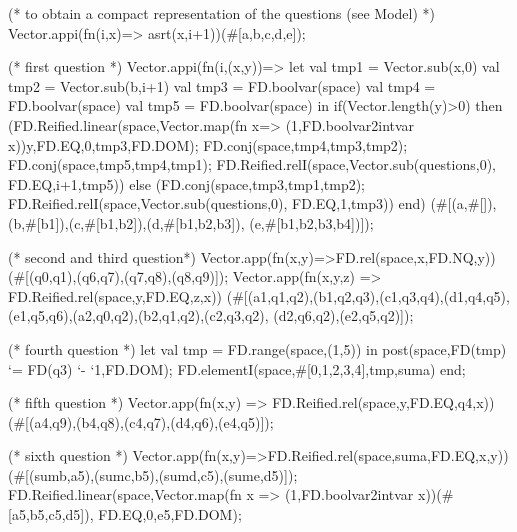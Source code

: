 \documentclass[a4paper,halfparskip]{scrartcl}
\begin{document}
\begin{myverbatim}
       (*  to obtain a compact representation of the questions
          (see Model) *)                              
        Vector.appi(fn(i,x)=> asrt(x,i+1))(#[a,b,c,d,e]);
           
       (* first question *)
        Vector.appi(fn(i,(x,y))=>
         let
             val tmp1 = Vector.sub(x,0)
             val tmp2 = Vector.sub(b,i+1)
             val tmp3 = FD.boolvar(space)
             val tmp4 = FD.boolvar(space)
             val tmp5 = FD.boolvar(space)
         in
             if(Vector.length(y)>0) 
             then
               (FD.Reified.linear(space,Vector.map(fn x=>
               (1,FD.boolvar2intvar x))y,FD.EQ,0,tmp3,FD.DOM);
                FD.conj(space,tmp4,tmp3,tmp2);
                FD.conj(space,tmp5,tmp4,tmp1);
                FD.Reified.relI(space,Vector.sub(questions,0),
                                      FD.EQ,i+1,tmp5))
             else
               (FD.conj(space,tmp3,tmp1,tmp2);
                FD.Reified.relI(space,Vector.sub(questions,0),
                                      FD.EQ,1,tmp3))
         end)
            (#[(a,#[]),(b,#[b1]),(c,#[b1,b2]),(d,#[b1,b2,b3]),
                 (e,#[b1,b2,b3,b4])]); 
            
           
       (* second and third question*)
        Vector.app(fn(x,y)=>FD.rel(space,x,FD.NQ,y))
                  (#[(q0,q1),(q6,q7),(q7,q8),(q8,q9)]);
        Vector.app(fn(x,y,z) => FD.Reified.rel(space,y,FD.EQ,z,x))
                    (#[(a1,q1,q2),(b1,q2,q3),(c1,q3,q4),(d1,q4,q5),
                       (e1,q5,q6),(a2,q0,q2),(b2,q1,q2),(c2,q3,q2),
                       (d2,q6,q2),(e2,q5,q2)]);
                         
       (* fourth question *)
        let 
            val tmp = FD.range(space,(1,5))
        in 
            post(space,FD(tmp) `= FD(q3) `- `1,FD.DOM);
            FD.elementI(space,#[0,1,2,3,4],tmp,suma)
        end;
            
       (* fifth question *)
        Vector.app(fn(x,y) => FD.Reified.rel(space,y,FD.EQ,q4,x))
                  (#[(a4,q9),(b4,q8),(c4,q7),(d4,q6),(e4,q5)]);
                      
       (* sixth question *)
        Vector.app(fn(x,y)=>FD.Reified.rel(space,suma,FD.EQ,x,y))
                    (#[(sumb,a5),(sumc,b5),(sumd,c5),(sume,d5)]);
        FD.Reified.linear(space,Vector.map(fn x =>
                        (1,FD.boolvar2intvar x))(#[a5,b5,c5,d5]),
                         FD.EQ,0,e5,FD.DOM); 
            

\end{myverbatim}
\end{document}
